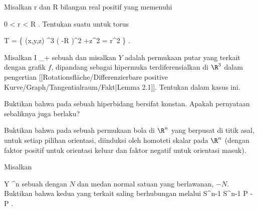 {}
{

Misalkan
\mathkor {} {r} {dan} {R} {}
bilangan real positif yang memenuhi

\mavergleichskette
{\vergleichskette
{ 0
}
{ < }{ r
}
{ < }{ R
}
{    }{
}
{   }{
}
}
{}{}{.}
Tentukan suatu
untuk torus
 {} {}

\mavergleichskettedisp
{\vergleichskette
{ T
}
{ =} { \left\{ (x,y,z) \in \R^3  \mid   \left(   -R  \right)^2 +z^2  = r^2         \right\}
}
{ } {
}
{ } {
}
{ } {
}
}
{}{}{.}

}
{} {}

{}
{

Misalkan
 { I } {\R_+
} {}
sebuah
dan misalkan $Y$ adalah permukaan putar yang terkait dengan grafik $f$, dipandang sebagai hipermuka terdiferensialkan di $\R^3$ dalam pengertian
[[Rotationsfläche/Differenzierbare positive Kurve/Graph/Tangentialraum/Fakt|Lemma 2.1]].
Tentukan
dalam kasus ini.

}
{} {}

{}
{

Buktikan bahwa
pada sebuah hiperbidang bersifat konstan. Apakah pernyataan sebaliknya juga berlaku?

}
{} {}

{}
{

Buktikan bahwa
pada sebuah permukaan bola di $\R^n$ yang berpusat di titik asal, untuk setiap pilihan orientasi, diinduksi oleh homoteti skalar pada $\R^n$ (dengan faktor positif untuk orientasi keluar dan faktor negatif untuk orientasi masuk).

}
{} {}

{}
{

Misalkan

\mavergleichskette
{\vergleichskette
{ Y
}
{ \subseteq }{ \R^n
}
{  }{
}
{    }{
}
{   }{
}
}
{}{}{}
sebuah
dengan
$N$ dan medan normal satuan yang berlawanan, $-N$. Buktikan bahwa kedua
yang terkait saling berhubungan melalui
\maabbeledisp {} {S^{n-1}} {S^{n-1}
} { P } { -P
} {.}

}
{} {}

